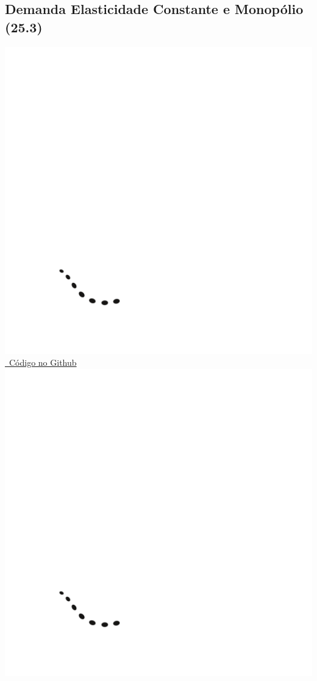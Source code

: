 \documentclass[a4paper,11pt,oneside]{book}
\theoremstyle{definition}
\theoremstyle{break}
\begin{document}
\subsection*{Demanda Elasticidade Constante e Monopólio (25.3)}

\begin{center}
\href{https://github.com/brunoruas2/Meus_Estudos/blob/main/Microeconomia/Microeconomics\%20-\%20Hal\%20Varian/models/cap25.3-demanda_ces_e_monopolio.py}{\includegraphics[scale=0.03]{_github_logo.png} \ Código no Github \includegraphics[scale=0.03]{_github_logo.png}}
\end{center}
\end{document}
